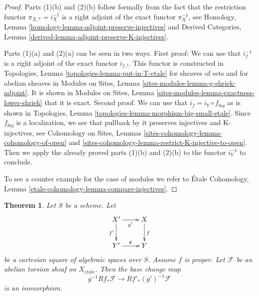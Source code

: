 \documentclass{stacks-project}
\theoremstyle{plain}
\newtheorem{theorem}[subsection]{Theorem}
\theoremstyle{definition}
\theoremstyle{remark}
\numberwithin{equation}{subsection}
\def\etale{{\acute{e}tale}}
\begin{document}
\begin{proof}
Parts (1)(b) and (2)(b)
follow formally from the fact that the restriction functor
$\pi_{X, *} = i_X^{-1}$ is a right adjoint of the exact functor
$\pi_X^{-1}$, see
Homology, Lemma \ref{homology-lemma-adjoint-preserve-injectives} and
Derived Categories, Lemma \ref{derived-lemma-adjoint-preserve-K-injectives}.

\medskip\noindent
Parts (1)(a) and (2)(a) can be seen in two ways. First proof: We can use
that $i_f^{-1}$ is a right adjoint of the exact functor $i_{f, !}$.
This functor is constructed in
Topologies, Lemma \ref{topologies-lemma-put-in-T-etale}
for sheaves of sets and for abelian sheaves in
Modules on Sites, Lemma \ref{sites-modules-lemma-g-shriek-adjoint}.
It is shown in Modules on Sites, Lemma
\ref{sites-modules-lemma-exactness-lower-shriek} that it is exact.
Second proof. We can use that $i_f = i_Y \circ f_{big}$ as is shown
in Topologies, Lemma \ref{topologies-lemma-morphism-big-small-etale}.
Since $f_{big}$ is a localization, we see that pullback by it
preserves injectives and K-injectives, see
Cohomology on Sites, Lemmas \ref{sites-cohomology-lemma-cohomology-of-open} and
\ref{sites-cohomology-lemma-restrict-K-injective-to-open}.
Then we apply the already proved parts (1)(b) and (2)(b)
to the functor $i_Y^{-1}$ to conclude.

\medskip\noindent
To see a counter example for the case of modules we refer to
\'Etale Cohomology, Lemma \ref{etale-cohomology-lemma-compare-injectives}.
\end{proof}

\begin{theorem}
\label{theorem-proper-base-change}
Let $S$ be a scheme. Let
$$
\xymatrix{
X' \ar[r]_{g'} \ar[d]_{f'} & X \ar[d]^f \\
Y' \ar[r]^g & Y
}
$$
be a cartesian square of algebraic spaces over $S$.
Assume $f$ is proper.
Let $\mathcal{F}$ be an abelian torsion sheaf on $X_\etale$.
Then the base change map
$$
g^{-1}Rf_*\mathcal{F} \longrightarrow Rf'_*(g')^{-1}\mathcal{F}
$$
is an isomorphism.
\end{theorem}
\end{document}
